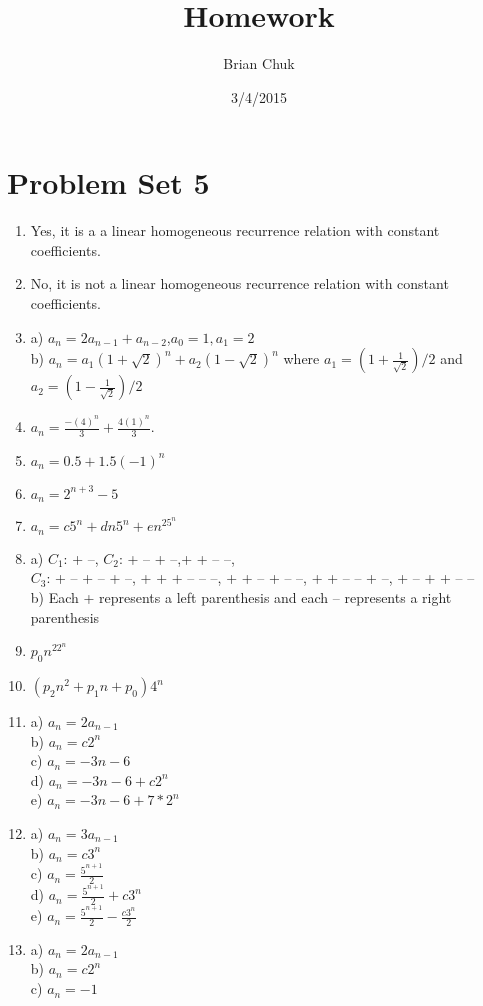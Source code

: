 \documentclass[11pt]{article}
\title{\textbf{Homework}}
\author{Brian Chuk}
\date{3/4/2015}
\begin{document}
\maketitle

\section{Problem Set 5}
\begin{enumerate}
\item Yes, it is a a linear homogeneous recurrence relation with constant coefficients.
\item No, it is not a linear homogeneous recurrence relation with constant coefficients.
\item a) $a_n=2a_{n-1} + a_{n-2}$,$a_0=1,a_1=2$
	\\b) $a_n=a_1(1+\sqrt{2})^n + a_2(1-\sqrt{2})^n$ where $a_1=(1+\frac{1}{\sqrt{2}})/2$ and $a_2=(1-\frac{1}{\sqrt{2}})/2$
\item $a_n = \frac{-(4)^n}{3} + \frac{4(1)^n}{3}$.	
\item $a_n = 0.5 + 1.5(-1)^n$
\item $a_n= 2^{n+3} - 5$
\item $a_n=c5^n+dn5^n+en^25^n$
\item a) $C_1$: + --, $C_2$:  + -- + --,+ + -- --, \\$C_3$: + -- + -- + --, + + + -- -- --, + + -- + -- --,
+ + -- -- + --, + -- + + -- --
	\\b) Each + represents a left parenthesis and each -- represents a right parenthesis
\item $p_0n^22^n$
\item $(p_2n^2 + p_1n + p_0)4^n$
\item a) $a_n = 2a_{n-1}$
	\\b) $a_n = c2^n$
	\\c) $a_n = -3n-6$
	\\d) $a_n = -3n-6 + c2^n$
	\\e) $a_n = -3n-6 + 7 * 2^n$
\item a) $a_n = 3a_{n-1}$
	\\b) $a_n = c3^n$
	\\c) $a_n = \frac{5^{n+1}}{2}$
	\\d) $a_n = \frac{5^{n+1}}{2} + c3^n$
	\\e) $a_n = \frac{5^{n+1}}{2} - \frac{c3^n}{2}$
\item a) $a_n = 2a_{n-1}$
	\\b) $a_n = c2^n$
	\\c) $a_n = -1$

\end{enumerate}
\end{document}
